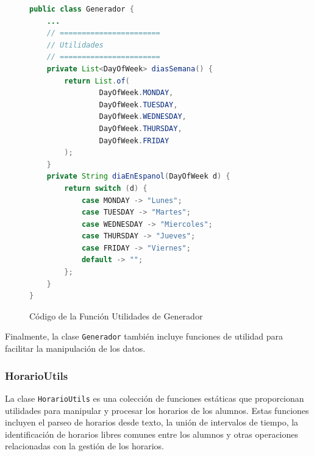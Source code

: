 \begin{figure}[H]
    \centering
    \begin{minipage}{0.9\textwidth}
    \caption{Código de la Función Utilidades de Generador}
    \label{code:Generador-Utilidades}
    \vspace{-0.2cm}
    \begin{lstlisting}[language=Java, basicstyle=\scriptsize\ttfamily]
public class Generador {
    ...
    // =======================
    // Utilidades
    // =======================
    private List<DayOfWeek> diasSemana() {
        return List.of(
                DayOfWeek.MONDAY,
                DayOfWeek.TUESDAY,
                DayOfWeek.WEDNESDAY,
                DayOfWeek.THURSDAY,
                DayOfWeek.FRIDAY
        );
    }
    private String diaEnEspanol(DayOfWeek d) {
        return switch (d) {
            case MONDAY -> "Lunes";
            case TUESDAY -> "Martes";
            case WEDNESDAY -> "Miercoles";
            case THURSDAY -> "Jueves";
            case FRIDAY -> "Viernes";
            default -> "";
        };
    }
}
    \end{lstlisting}
    \end{minipage}
\end{figure}

Finalmente, la clase \texttt{Generador} también incluye funciones de utilidad para facilitar la manipulación de los datos.

\subsubsection{HorarioUtils}
La clase \texttt{HorarioUtils} es una colección de funciones estáticas que proporcionan utilidades para manipular y procesar los horarios de los alumnos.
Estas funciones incluyen el parseo de horarios desde texto, la unión de intervalos de tiempo, la identificación de horarios libres comunes entre los alumnos
y otras operaciones relacionadas con la gestión de los horarios.


